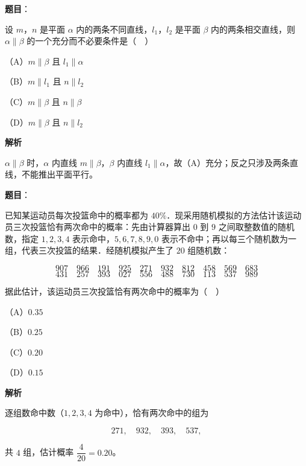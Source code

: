 \begin{answer}

\textbf{题目}：

设 $m$，$n$ 是平面 $\alpha$ 内的两条不同直线，$l_1$，$l_2$ 是平面 $\beta$ 内的两条相交直线，则 $\alpha\parallel\beta$ 的一个充分而不必要条件是（　）

（A）$m\parallel\beta$ 且 $l_1\parallel\alpha$

（B）$m\parallel l_1$ 且 $n\parallel l_2$

（C）$m\parallel\beta$ 且 $n\parallel\beta$

（D）$m\parallel\beta$ 且 $n\parallel l_2$

\textbf{解析}

$\alpha\parallel\beta$ 时，$\alpha$ 内直线 $m\parallel\beta$，$\beta$ 内直线 $l_1\parallel\alpha$，故（A）充分；反之只涉及两条直线，不能推出平面平行。


\end{answer}
\begin{answer}

\textbf{题目}：

已知某运动员每次投篮命中的概率都为 $40\%$．现采用随机模拟的方法估计该运动员三次投篮恰有两次命中的概率：先由计算器算出 $0$ 到 $9$ 之间取整数值的随机数，指定 $1,2,3,4$ 表示命中，$5,6,7,8,9,0$ 表示不命中；再以每三个随机数为一组，代表三次投篮的结果．经随机模拟产生了 $20$ 组随机数：

\nopagebreak[4]
\[907\quad966\quad191\quad925\quad271\quad932\quad812\quad458\quad569\quad683\]
\nopagebreak[4]
\[431\quad257\quad393\quad027\quad556\quad488\quad730\quad113\quad537\quad989\]

据此估计，该运动员三次投篮恰有两次命中的概率为（　）

（A）$0.35$

（B）$0.25$

（C）$0.20$

（D）$0.15$

\textbf{解析}

逐组数命中数（$1,2,3,4$ 为命中），恰有两次命中的组为

\nopagebreak[4]
\[271,\quad932,\quad393,\quad537,\]

共 $4$ 组，估计概率 $\dfrac4{20}=0.20$。


\end{answer}
